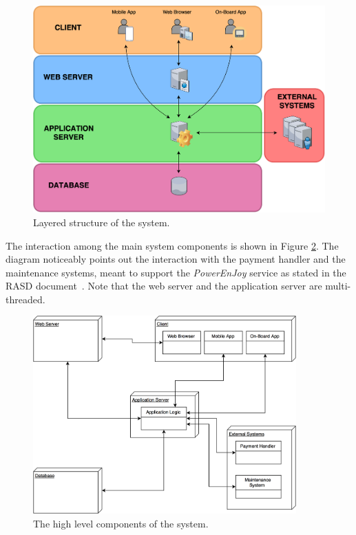 \begin{figure}[H]
\begin{center}
		\includegraphics[width=\textwidth]{./arch_design/diagrams/system_layers.png}
		\caption{Layered structure of the system.}
		\label{sys_layers}
\end{center}
\end{figure}

The interaction among the main system components is shown in Figure \ref{sys_comps}. The diagram noticeably points out the interaction with the payment handler and the maintenance systems, meant to support the \emph{PowerEnJoy} service as stated in the RASD document~\cite{rasd}. Note that the web server and the application server are multi-threaded.

\begin{figure}[H]
\begin{center}
		\includegraphics[width=0.9\textwidth]{./arch_design/diagrams/system_components.png}
		\caption{The high level components of the system.}
		\label{sys_comps}
\end{center}
\end{figure}